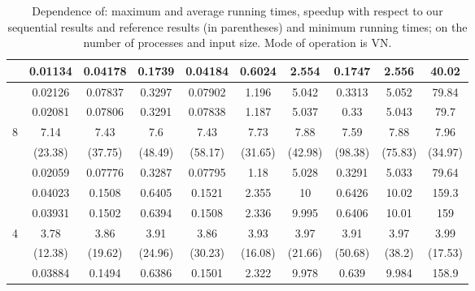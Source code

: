 \begin{table}[ht]
\begin{tabular}{c|c|c|c|c|c|c|c|c|c|}
 & 0.01134 & 0.04178 & 0.1739 & 0.04184 & 0.6024 & 2.554 & 0.1747 & 2.556 & 40.02 \\
\hline
 & 0.02126 & 0.07837 & 0.3297 & 0.07902 & 1.196 & 5.042 & 0.3313 & 5.052 & 79.84 \\
 & 0.02081 & 0.07806 & 0.3291 & 0.07838 & 1.187 & 5.037 & 0.33 & 5.043 & 79.7 \\
8 & 7.14 & 7.43 & 7.6 & 7.43 & 7.73 & 7.88 & 7.59 & 7.88 & 7.96 \\
 & (23.38) & (37.75) & (48.49) & (58.17) & (31.65) & (42.98) & (98.38) & (75.83) & (34.97) \\
 & 0.02059 & 0.07776 & 0.3287 & 0.07795 & 1.18 & 5.028 & 0.3291 & 5.033 & 79.64 \\
\hline
 & 0.04023 & 0.1508 & 0.6405 & 0.1521 & 2.355 & 10 & 0.6426 & 10.02 & 159.3 \\
 & 0.03931 & 0.1502 & 0.6394 & 0.1508 & 2.336 & 9.995 & 0.6406 & 10.01 & 159 \\
4 & 3.78 & 3.86 & 3.91 & 3.86 & 3.93 & 3.97 & 3.91 & 3.97 & 3.99 \\
 & (12.38) & (19.62) & (24.96) & (30.23) & (16.08) & (21.66) & (50.68) & (38.2) & (17.53) \\
 & 0.03884 & 0.1494 & 0.6386 & 0.1501 & 2.322 & 9.978 & 0.639 & 9.984 & 158.9 \\
\hline
\end{tabular}
\caption{Dependence of: maximum and average running times, speedup with respect to our sequential results and reference results (in parentheses) and minimum running times; on the number of processes and input size. Mode of operation is VN.}
\end{table}

